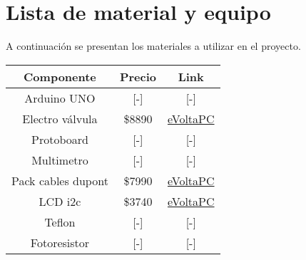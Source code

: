 \section{Lista de material y equipo}

A continuaci\'on se presentan los materiales a utilizar
en el proyecto.
\begin{center}
     
   
    \begin{tabular}{ | c | c | c |}
        \hline
        Componente & Precio & Link \\ \hline
        Arduino UNO & [-] & [-]\\
        Electro v\'alvula &  \$8890 & \href{https://www.evoltapc.cl/otros-accesorios/2263-valvula-selenoide-12v-1-2-normalmente-cerrada-arduino-jardin-peceras.html}{eVoltaPC}\\
        Protoboard & [-] & [-]\\
        Multimetro & [-] & [-]\\
        Pack cables dupont & \$7990 & \href{https://www.evoltapc.cl/cables-y-conectores/3498-kit-120-cables-dupont-20cm-m-m-m-h-h-h-arduino-protoboard.html}{eVoltaPC}\\
        LCD i2c & \$3740 & \href{https://www.evoltapc.cl/pantallas-lcd/2663-pantalla-lcd-1602-con-i2c-integrado-arduino-raspberry-pi.html}{eVoltaPC}\\
        Teflon & [-] & [-] \\
        Fotoresistor & [-] & [-]\\ \hline
    \end{tabular}
\end{center} 